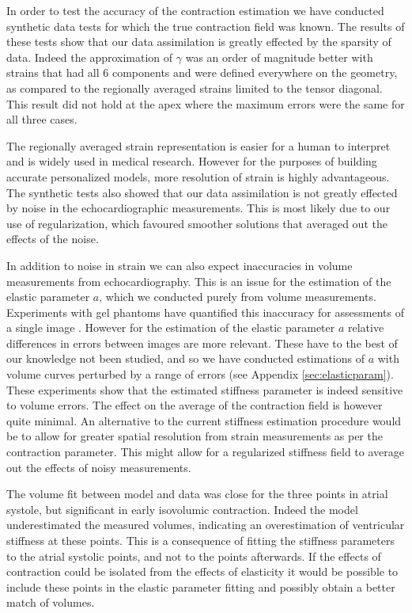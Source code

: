 In order to test the accuracy of the contraction estimation 
we have conducted synthetic data tests for which the true
contraction field was known. The results of these tests
show that our data assimilation is greatly effected by the 
sparsity of data. Indeed the approximation of $\gamma$ was an order of magnitude better with strains
that had all 6 components and were defined everywhere on the geometry, 
as compared to the regionally averaged strains limited
to the tensor diagonal. This result did not hold at the apex where
the maximum errors were the same for all three cases.

The regionally averaged strain representation is easier for a
human to interpret and is widely used in 
medical research. However for the purposes of building accurate personalized models, 
more resolution of strain is highly advantageous.
The synthetic tests also showed that our data assimilation 
is not greatly effected by noise in the echocardiographic measurements. 
This is most likely due to our use of regularization, which favoured
smoother solutions that averaged out the effects of the noise. 

In addition to noise in strain we can also expect inaccuracies in volume measurements from echocardiography.
This is an issue for the estimation of the elastic parameter $a$, which we conducted purely from volume measurements.
Experiments with gel phantoms have quantified this inaccuracy for assessments of a single image \cite{aurich2014assessment}. 
However for the estimation of the elastic parameter $a$ relative differences in errors between images are more relevant.
These have to the best of our knowledge not been studied, and so we have conducted estimations of $a$ 
with volume curves perturbed by a range of errors (see Appendix \ref{sec:elasticparam}). 
These experiments show that the estimated stiffness parameter is indeed sensitive to volume errors. The effect on
the average of the contraction field is however quite minimal. 
An alternative to the current stiffness estimation procedure would be to allow
for greater spatial resolution from strain measurements as per the contraction parameter. 
This might allow for a regularized stiffness field to average out the effects of noisy measurements.

The volume fit between model and data was close for the three points in atrial systole, but significant
in early isovolumic contraction. Indeed the model underestimated the measured volumes,
indicating an overestimation of ventricular stiffness at these points. This is a consequence of 
fitting the stiffness parameters to the atrial systolic points, and not to the points afterwards. If the effects
of contraction could be isolated from the effects of elasticity it would be possible to 
include these points in the elastic parameter fitting and possibly obtain a better match of volumes.


